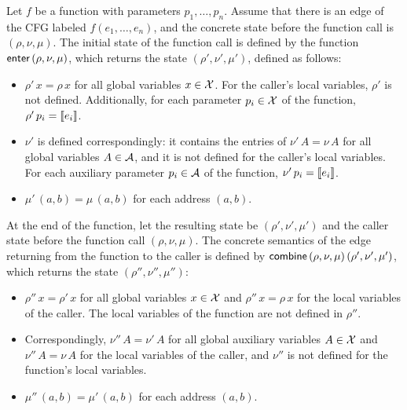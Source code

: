 Let $f$ be a function with parameters $p_1, \ldots, p_n$.
Assume that there is an edge of the CFG labeled $f(e_1, \ldots, e_n)$,
and the concrete state before the function call is $(\rho, \nu, \mu)$.
The initial state of the function call is defined by the function $\textsf{enter}\,(\rho, \nu, \mu)$, which returns the state $(\rho', \nu', \mu')$, defined as follows:
\begin{itemize}
    \item $\rho'\,x = \rho\,x$ for all global variables $x \in \mathcal{X}$.
          For the caller's local variables, $\rho'$ is not defined.
          Additionally, for each parameter $p_i \in \mathcal{X}$ of the function, $\rho'\,p_i = \llbracket e_i\rrbracket$.
    \item $\nu'$ is defined correspondingly: it contains the entries of $\nu'\,A = \nu\,A$ for all global variables $A \in \mathcal{A}$, and it is not defined for the caller's local variables.
          For each auxiliary parameter $p_i \in \mathcal{A}$ of the function, $\nu'\,p_i=\llbracket e_i\rrbracket$.
    \item $\mu'\,(a,b)=\mu\,(a,b)$ for each address $(a,b)$.
\end{itemize}

At the end of the function, let the resulting state be $(\rho', \nu', \mu')$ and the caller state before the function call  $(\rho, \nu, \mu)$.
The concrete semantics of the edge returning from the function to the caller is defined by $\textsf{combine}\,(\rho, \nu, \mu)\,(\rho', \nu', \mu')$, which returns the state $(\rho'', \nu'', \mu'')$:
\begin{itemize}
    \item $\rho''\,x = \rho'\,x$ for all global variables $x \in \mathcal{X}$ and $\rho''\,x = \rho\,x$ for the local variables of the caller.
          The local variables of the function are not defined in $\rho''$.
    \item Correspondingly, $\nu''\,A = \nu'\,A$ for all global auxiliary variables $A \in \mathcal{X}$ and $\nu''\,A = \nu\,A$ for the local variables of the caller, and $\nu''$ is not defined for the function's local variables.
    \item $\mu''\,(a,b)=\mu'\,(a,b)$ for each address $(a,b)$.
\end{itemize}

